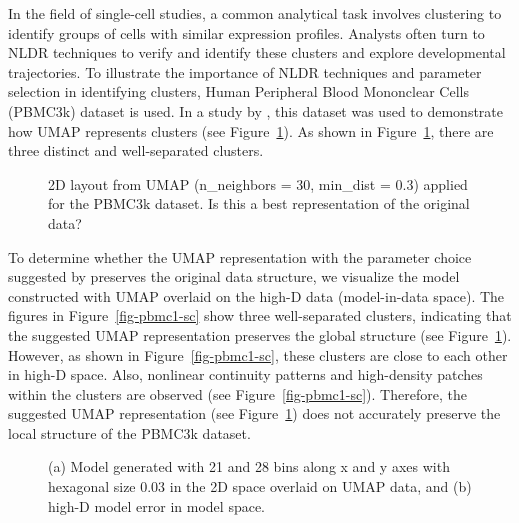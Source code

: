 \documentclass[
  12pt]{article}
\begin{document}
In the field of single-cell studies, a common analytical task involves
clustering to identify groups of cells with similar expression profiles.
Analysts often turn to NLDR techniques to verify and identify these
clusters and explore developmental trajectories. To illustrate the
importance of NLDR techniques and parameter selection in identifying
clusters, Human Peripheral Blood Mononclear Cells (PBMC3k) dataset
\citep{chen2023} is used. In a study by \citet{chen2023}, this dataset
was used to demonstrate how UMAP represents clusters (see
Figure~\ref{fig-umapauthor}). As shown in Figure~\ref{fig-umapauthor},
there are three distinct and well-separated clusters.

\begin{figure}[H]


\caption{\label{fig-umapauthor}2D layout from UMAP (n\_neighbors = 30,
min\_dist = 0.3) applied for the PBMC3k dataset. Is this a best
representation of the original data?}

\end{figure}%

To determine whether the UMAP representation with the parameter choice
suggested by \citet{chen2023} preserves the original data structure, we
visualize the model constructed with UMAP overlaid on the high-D data
(model-in-data space). The figures in Figure~\ref{fig-pbmc1-sc} show
three well-separated clusters, indicating that the suggested UMAP
representation preserves the global structure (see
Figure~\ref{fig-umapauthor}). However, as shown in
Figure~\ref{fig-pbmc1-sc}, these clusters are close to each other in
high-D space. Also, nonlinear continuity patterns and high-density
patches within the clusters are observed (see
Figure~\ref{fig-pbmc1-sc}). Therefore, the suggested UMAP representation
(see Figure~\ref{fig-umapauthor}) does not accurately preserve the local
structure of the PBMC3k dataset.

\begin{figure}[H]


\caption{\label{fig-nldervisPBMCUMAP}(a) Model generated with 21 and 28
bins along x and y axes with hexagonal size 0.03 in the 2D space
overlaid on UMAP data, and (b) high-D model error in model space.}

\end{figure}%
\end{document}
